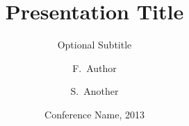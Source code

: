 \documentclass{beamer}
\title{Presentation Title}
\subtitle{Optional Subtitle}
\author{F.~Author\inst{1} \and S.~Another\inst{2}}
\institute[Universities of Somewhere and Elsewhere] %
{
  \inst{1}%
  University of Somewhere
  \inst{2}%
  University of Elsewhere}
\date{Conference Name, 2013}
\begin{document}
\begin{frame}
  \titlepage
\end{frame}
\end{document}
